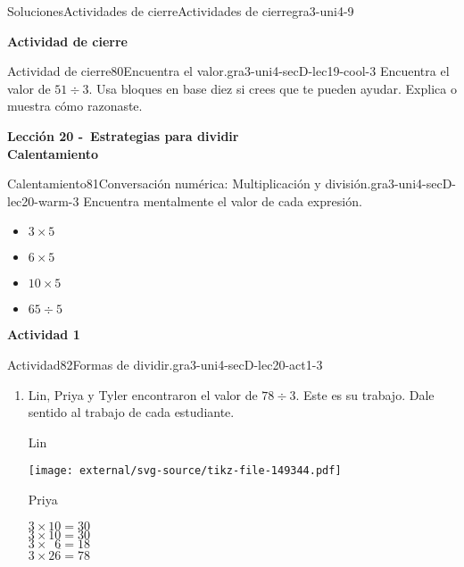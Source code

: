 \documentclass[twoside,10pt,]{article}
\begin{document}
\begin{solutions-section}{Soluciones}{Actividades de cierre}{}{Actividades de cierre}{}{}{gra3-uni4-9}
\par\medskip
\noindent\textbf{\large{}\space\textperiodcentered\space{}Actividad de cierre}
\begin{projectsolution}{Actividad de cierre}{80}{Encuentra el valor.}{gra3-uni4-secD-lec19-cool-3}%
Encuentra el valor de \(51 \div 3.\) Usa bloques en base diez si crees que te pueden ayudar. Explica o muestra cómo razonaste.%
\end{projectsolution}%
\par\medskip
\noindent\textbf{\large{}\space\textperiodcentered\space{}Lección 20 -~Estrategias para dividir\\
\space\textperiodcentered\space{}Calentamiento}
\begin{explorationsolution}{Calentamiento}{81}{Conversación numérica: Multiplicación y división.}{gra3-uni4-secD-lec20-warm-3}%
Encuentra mentalmente el valor de cada expresión.%
%
\begin{itemize}[label=\textbullet]
\item{}\(\displaystyle 3\times 5\)%
\item{}\(\displaystyle 6\times 5\)%
\item{}\(\displaystyle 10\times 5\)%
\item{}\(\displaystyle 65\div 5\)%
\end{itemize}
\end{explorationsolution}%
\par\medskip
\noindent\textbf{\large{}\space\textperiodcentered\space{}Actividad 1}
\begin{activitysolution}{Actividad}{82}{Formas de dividir.}{gra3-uni4-secD-lec20-act1-3}%
%
\begin{enumerate}
\item{}Lin, Priya y Tyler encontraron el valor de \(78 \div 3\). Este es su trabajo. Dale sentido al trabajo de cada estudiante.%
\par
Lin%
\par
\begin{image}{0}{1}{0}{}%
\texttt{[image: external/svg-source/tikz-file-149344.pdf]}
\end{image}%
%
\begin{sidebyside}{2}{0}{0}{0}%
\begin{sbspanel}{0.5}%
Priya%
\par
\(3\times 10 = 30\)\\
 \(3\times 10 = 30\)\\
 \(3\times \phantom{0}6 = 18\)\\
 \(\overline {3 \times 26 =78}\)%

\end{sbspanel}
\end{sidebyside}
\end{enumerate}
\end{activitysolution}
\end{solutions-section}
\end{document}
